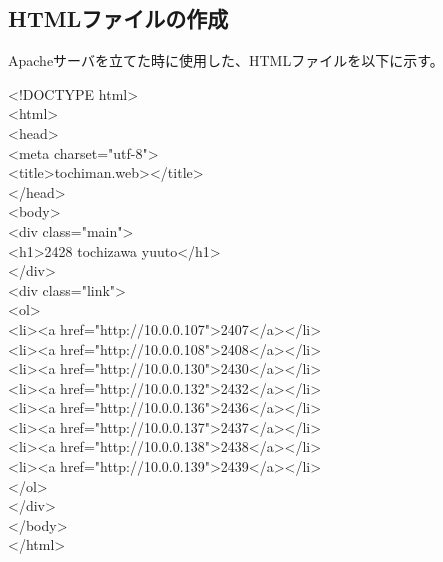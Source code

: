 \documentclass[12pt,a4paper]{jsarticle}
\numberwithin{equation}{section}
\numberwithin{figure}{section}
\numberwithin{table}{section}
\begin{document}
  \subsection{HTMLファイルの作成}
  Apacheサーバを立てた時に使用した、HTMLファイルを以下に示す。
  \begin{screen}
    \textless !DOCTYPE html\textgreater\\
    \textless html\textgreater\\
      \textless head\textgreater\\
        \quad\textless meta charset="utf-8"\textgreater\\
        \quad\textless title\textgreater tochiman.web\textgreater\textless/title\textgreater\\
      \textless /head\textgreater\\
      \textless body\textgreater\\
        \quad\textless div class="main"\textgreater\\
          \quad\quad\textless h1\textgreater2428 tochizawa yuuto\textless/h1\textgreater\\
        \quad\textless/div\textgreater\\
        \textless div class="link"\textgreater\\
          \quad\quad\textless ol\textgreater\\
            \quad\quad\quad\textless li\textgreater\textless a href="http://10.0.0.107"\textgreater2407\textless/a\textgreater\textless/li\textgreater\\
            \quad\quad\quad\textless li\textgreater\textless a href="http://10.0.0.108"\textgreater2408\textless/a\textgreater\textless/li\textgreater\\
            \quad\quad\quad\textless li\textgreater\textless a href="http://10.0.0.130"\textgreater2430\textless/a\textgreater\textless/li\textgreater\\
            \quad\quad\quad\textless li\textgreater\textless a href="http://10.0.0.132"\textgreater2432\textless/a\textgreater\textless/li\textgreater\\
            \quad\quad\quad\textless li\textgreater\textless a href="http://10.0.0.136"\textgreater2436\textless/a\textgreater\textless/li\textgreater\\
            \quad\quad\quad\textless li\textgreater\textless a href="http://10.0.0.137"\textgreater2437\textless/a\textgreater\textless/li\textgreater\\
            \quad\quad\quad\textless li\textgreater\textless a href="http://10.0.0.138"\textgreater2438\textless/a\textgreater\textless/li\textgreater\\
            \quad\quad\quad\textless li\textgreater\textless a href="http://10.0.0.139"\textgreater2439\textless/a\textgreater\textless/li\textgreater\\
            \quad\quad\textless /ol\textgreater\\
            \quad\textless /div\textgreater\\
      \textless /body\textgreater\\
    \textless /html\textgreater
  \end{screen}
\newpage
\end{document}
